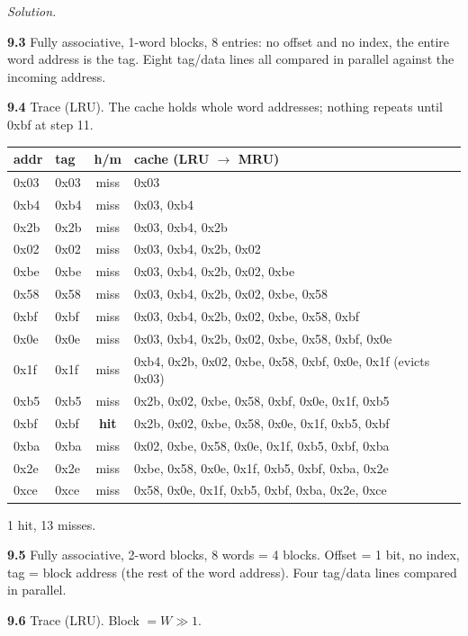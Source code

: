 \documentclass[12pt]{article}
\newenvironment{solution}{\par\noindent\textit{Solution.}\ }{\par\vspace{1.1em}}
\newcommand{\subproblem}[1]{\par\vspace{0.45em}\noindent\textbf{#1}\quad}
\begin{document}
\begin{solution}
\subproblem{9.3} Fully associative, 1-word blocks, 8 entries: no offset and no index, the entire word address is the tag. Eight tag/data lines all compared in parallel against the incoming address.

\subproblem{9.4} Trace (LRU). The cache holds whole word addresses; nothing repeats until 0xbf at step 11.

\begin{center}\small
\begin{tabular}{@{}llcl@{}}\toprule
addr & tag & h/m & cache (LRU $\to$ MRU) \\\midrule
0x03 & 0x03 & miss & 0x03 \\
0xb4 & 0xb4 & miss & 0x03, 0xb4 \\
0x2b & 0x2b & miss & 0x03, 0xb4, 0x2b \\
0x02 & 0x02 & miss & 0x03, 0xb4, 0x2b, 0x02 \\
0xbe & 0xbe & miss & 0x03, 0xb4, 0x2b, 0x02, 0xbe \\
0x58 & 0x58 & miss & 0x03, 0xb4, 0x2b, 0x02, 0xbe, 0x58 \\
0xbf & 0xbf & miss & 0x03, 0xb4, 0x2b, 0x02, 0xbe, 0x58, 0xbf \\
0x0e & 0x0e & miss & 0x03, 0xb4, 0x2b, 0x02, 0xbe, 0x58, 0xbf, 0x0e \\
0x1f & 0x1f & miss & 0xb4, 0x2b, 0x02, 0xbe, 0x58, 0xbf, 0x0e, 0x1f (evicts 0x03) \\
0xb5 & 0xb5 & miss & 0x2b, 0x02, 0xbe, 0x58, 0xbf, 0x0e, 0x1f, 0xb5 \\
0xbf & 0xbf & \textbf{hit}  & 0x2b, 0x02, 0xbe, 0x58, 0x0e, 0x1f, 0xb5, 0xbf \\
0xba & 0xba & miss & 0x02, 0xbe, 0x58, 0x0e, 0x1f, 0xb5, 0xbf, 0xba \\
0x2e & 0x2e & miss & 0xbe, 0x58, 0x0e, 0x1f, 0xb5, 0xbf, 0xba, 0x2e \\
0xce & 0xce & miss & 0x58, 0x0e, 0x1f, 0xb5, 0xbf, 0xba, 0x2e, 0xce \\
\bottomrule\end{tabular}\end{center}
1 hit, 13 misses.

\subproblem{9.5} Fully associative, 2-word blocks, 8 words = 4 blocks. Offset = 1 bit, no index, tag = block address (the rest of the word address). Four tag/data lines compared in parallel.

\subproblem{9.6} Trace (LRU). Block $= W{\gg}1$.


\end{solution}
\end{document}
